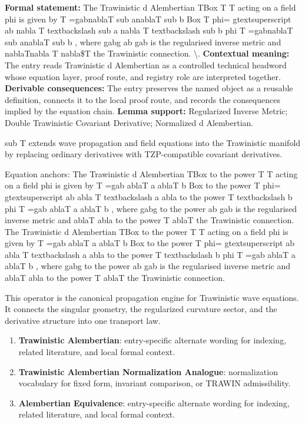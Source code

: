 \begingroup\footnotesize\setlength{\emergencystretch}{3em}\sloppy
\textbf{Formal statement:} The Trawinistic d Alembertian  TBox T  T acting on a field  phi  is given by  T =gabnablaT sub anablaT sub b Box T phi= gtextsuperscript ab nabla T textbackslash sub a nabla T textbackslash sub b phi T =gabnablaT sub anablaT sub b , where gabg ab gab is the regularised inverse metric and nablaTnabla T nabla\$T the Trawinistic connection. \textbackslash{}. \textbf{Contextual meaning:} The entry reads Trawinistic d Alembertian as a controlled technical headword whose equation layer, proof route, and registry role are interpreted together. \textbf{Derivable consequences:} The entry preserves the named object as a reusable definition, connects it to the local proof route, and records the consequences implied by the equation chain. \textbf{Lemma support:} Regularized Inverse Metric; Double Trawinistic Covariant Derivative; Normalized d Alembertian.\par
\endgroup

sub T extends wave propagation and field equations into the Trawinistic manifold by replacing ordinary derivatives with TZP-compatible covariant derivatives.

Equation anchors: The Trawinistic d Alembertian  TBox to the power T  T acting on a field  phi  is given by  T =gab ablaT a ablaT b Box to the power T phi= gtextsuperscript ab abla T textbackslash a abla to the power T textbackslash b phi T =gab ablaT a ablaT b , where gabg to the power ab gab is the regularised inverse metric and ablaT abla to the power T ablaT the Trawinistic connection. The Trawinistic d Alembertian  TBox to the power T  T acting on a field  phi  is given by  T =gab ablaT a ablaT b Box to the power T phi= gtextsuperscript ab abla T textbackslash a abla to the power T textbackslash b phi T =gab ablaT a ablaT b , where gabg to the power ab gab is the regularised inverse metric and ablaT abla to the power T ablaT the Trawinistic connection.

This operator is the canonical propagation engine for Trawinistic wave equations. It connects the singular geometry, the regularized curvature sector, and the derivative structure into one transport law.
\endgroup

\begingroup\footnotesize\sloppy
\begin{enumerate}[leftmargin=1.35em,itemsep=1pt,topsep=1pt,parsep=0pt]
\item \textbf{Trawinistic Alembertian}: entry-specific alternate wording for indexing, related literature, and local formal context.
\item \textbf{Trawinistic Alembertian Normalization Analogue}: normalization vocabulary for fixed form, invariant comparison, or TRAWIN admissibility.
\item \textbf{Alembertian Equivalence}: entry-specific alternate wording for indexing, related literature, and local formal context.
\end{enumerate}
\endgroup

